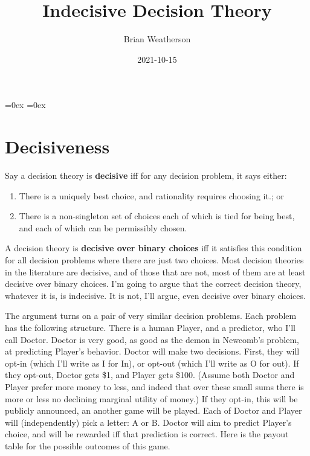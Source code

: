 \documentclass[
  12pt,
]{article}
\title{Indecisive Decision Theory}
\author{Brian Weatherson}
\date{2021-10-15}
\providecommand{\tightlist}{%
  \setlength{\itemsep}{0pt}\setlength{\parskip}{0pt}}
\begin{document}
\maketitle

\setlength\heavyrulewidth{0ex}
\setlength\lightrulewidth{0.08ex}

\aboverulesep=0ex
\belowrulesep=0ex
\renewcommand{\arraystretch}{1.2}
\hypersetup{hidelinks}

\renewcommand\refname{References}

\captionsetup{labelformat=empty, font = small, font = bf, position = below}

\hypertarget{decisiveness}{%
\section{Decisiveness}\label{decisiveness}}

Say a decision theory is \textbf{decisive} iff for any decision problem,
it says either:

\begin{enumerate}
\def\labelenumi{\arabic{enumi}.}
\tightlist
\item
  There is a uniquely best choice, and rationality requires choosing
  it.; or
\item
  There is a non-singleton set of choices each of which is tied for
  being best, and each of which can be permissibly chosen.
\end{enumerate}

A decision theory is \textbf{decisive over binary choices} iff it
satisfies this condition for all decision problems where there are just
two choices. Most decision theories in the literature are decisive, and
of those that are not, most of them are at least decisive over binary
choices. I'm going to argue that the correct decision theory, whatever
it is, is indecisive. It is not, I'll argue, even decisive over binary
choices.

The argument turns on a pair of very similar decision problems. Each
problem has the following structure. There is a human Player, and a
predictor, who I'll call Doctor. Doctor is very good, as good as the
demon in Newcomb's problem, at predicting Player's behavior. Doctor will
make two decisions. First, they will opt-in (which I'll write as I for
In), or opt-out (which I'll write as O for out). If they opt-out, Doctor
gets \$1, and Player gets \$100. (Assume both Doctor and Player prefer
more money to less, and indeed that over these small sums there is more
or less no declining marginal utility of money.) If they opt-in, this
will be publicly announced, an another game will be played. Each of
Doctor and Player will (independently) pick a letter: A or B. Doctor
will aim to predict Player's choice, and will be rewarded iff that
prediction is correct. Here is the payout table for the possible
outcomes of this game.
\end{document}
